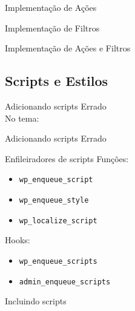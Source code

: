 \documentclass{beamer}
\begin{document}
\begin{frame}{Implementação de Ações}
  
  \pause 
\end{frame}

\begin{frame}{Implementação de Filtros}
  
  \pause 
\end{frame}

\begin{frame}{Implementação de Ações e Filtros}
  
\end{frame}

\subsection{Scripts e Estilos}

\begin{frame}{Adicionando scripts}
  \pause Errado \\
  \pause No tema:
  
\end{frame}

\begin{frame}{Adicionando scripts}
  \pause Errado
  \pause 
\end{frame}

\begin{frame}{Enfileiradores de scripts}
\pause Funções:
\begin{itemize}
  \pause \item \texttt{wp\_enqueue\_script}
  \pause \item \texttt{wp\_enqueue\_style}
  \pause \item \texttt{wp\_localize\_script}
\end{itemize}
\pause Hooks:
\begin{itemize}
  \pause \item \texttt{wp\_enqueue\_scripts}
  \pause \item \texttt{admin\_enqueue\_scripts}
\end{itemize}
\end{frame}

\begin{frame}{Incluindo scripts}
  \pause 
\end{frame}
\end{document}
